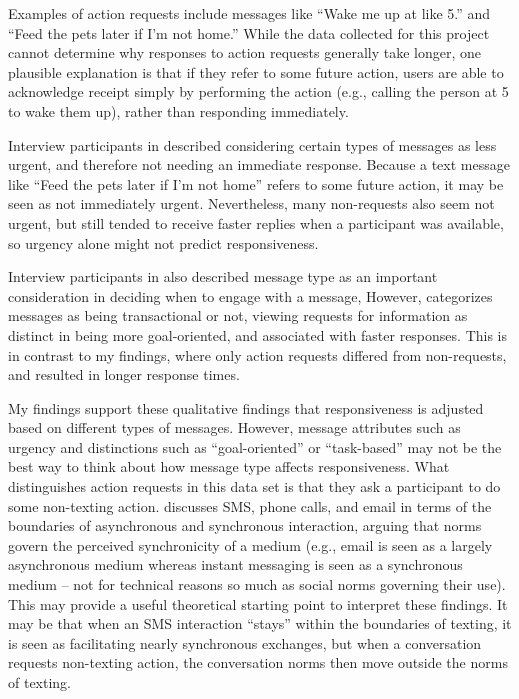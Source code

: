 \documentclass[12pt]{nuthesis}	%
\begin{document}
Examples of action requests include messages like ``Wake me up at like 5.'' and ``Feed the pets later if I'm not home.'' While the data collected for this project cannot determine why responses to action requests generally take longer, one plausible explanation is that if they refer to some future action, users are able to acknowledge receipt simply by performing the action (e.g., calling the person at 5 to wake them up), rather than responding immediately.

Interview participants in \citet{wohn2015ambient} described considering certain types of messages as less urgent, and therefore not needing an immediate response. Because a text message like ``Feed the pets later if I'm not home'' refers to some future action, it may be seen as not immediately urgent. Nevertheless, many non-requests also seem not urgent, but still tended to receive faster replies when a participant was available, so urgency alone might not predict responsiveness.

Interview participants in \citet{cui2016beyond} also described message type as an important consideration in deciding when to engage with a message, However, \citet{cui2016beyond} categorizes messages as being transactional or not, viewing requests for information as distinct in being more goal-oriented, and associated with faster responses. This is in contrast to my findings, where only action requests differed from non-requests, and resulted in longer response times.

My findings support these qualitative findings that responsiveness is adjusted based on different types of messages. However, message attributes such as urgency and distinctions such as ``goal-oriented'' or ``task-based'' may not be the best way to think about how message type affects responsiveness. What distinguishes action requests in this data set is that they ask a participant to do some non-texting action. \citet{rettie2009mobile} discusses SMS, phone calls, and email in terms of the boundaries of asynchronous and synchronous interaction, arguing that norms govern the perceived synchronicity of a medium (e.g., email is seen as a largely asynchronous medium whereas instant messaging is seen as a synchronous medium -- not for technical reasons so much as social norms governing their use). This may provide a useful theoretical starting point to interpret these findings. It may be that when an SMS interaction ``stays'' within the boundaries of texting, it is seen as facilitating nearly synchronous exchanges, but when a conversation requests non-texting action, the conversation norms then move outside the norms of texting.
\end{document}
